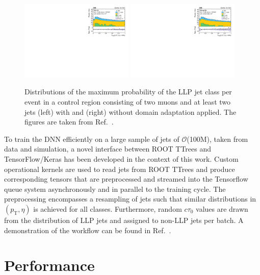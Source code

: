 \documentclass{webofc}
\newcommand{\ctau}{\ensuremath{c\tau_{0}}\xspace}
\newcommand{\pt}{\ensuremath{p_\textrm{T}}\xspace}
\begin{document}
\begin{figure}[!ht]
\includegraphics[width=0.48\textwidth]{figs/2mu_2toNj__llpdnnx_da_0_max_highpt.pdf}\hspace{0.03\textwidth}
\includegraphics[width=0.48\textwidth]{figs/2mu_2toNj__llpdnnx_noda_0_max_highpt.pdf}
\centering
\caption{Distributions of the maximum probability of the LLP jet class per event in a control region consisting of two muons and at least two jets (left) with and (right) without domain adaptation applied. The figures are taken from Ref.~\cite{CMS-EXO-19-011}.}
\label{da}
\end{figure}

To train the DNN efficiently on a large sample of jets of $\mathcal{O}$(100M), taken from data and simulation, a novel interface between ROOT TTrees and TensorFlow/Keras has been developed in the context of this work. Custom operational kernels are used to read jets from ROOT TTrees and produce corresponding tensors that are preprocessed and streamed into the Tensorflow queue system asynchronously and in parallel to the training cycle. The preprocessing encompasses a resampling of jets such that similar distributions in $(\pt,\eta)$ is achieved for all classes. Furthermore, random \ctau values are drawn from the distribution of LLP jets and assigned to non-LLP jets per batch. A demonstration of the workflow can be found in Ref.~\cite{code}.

\section{Performance}
\label{peformance}
\end{document}
